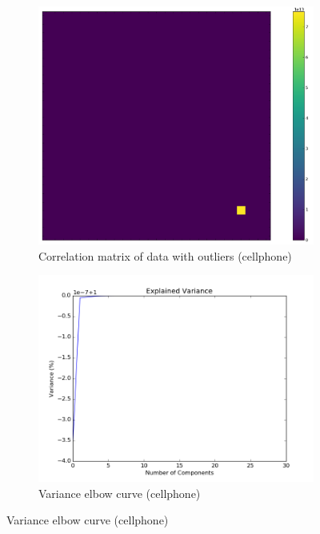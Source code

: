 \documentclass[20pt]{article} %
\begin{document}
\newpage
\begin{figure}[!htbp]
  	\centering
   	\begin{subfigure}[p]{0.4\linewidth}
    	\includegraphics[width=\linewidth]{../figures/anotherfullheatmap.png}
	\caption{Correlation matrix of data with outliers (cellphone)}
   	\end{subfigure}
   	\begin{subfigure}[p]{0.4\linewidth}
    	\includegraphics[width=\linewidth]{../figures/explained_variance.png}
	\caption{Variance elbow curve (cellphone)}
   	\end{subfigure}
\end{figure} 
\end{document}
